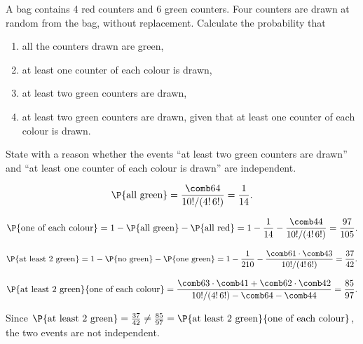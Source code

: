 \begin{problem}
    A bag contains 4 red counters and 6 green counters. Four counters are drawn at random from the bag, without replacement. Calculate the probability that
    \begin{enumerate}
        \item all the counters drawn are green,
        \item at least one counter of each colour is drawn,
        \item at least two green counters are drawn,
        \item at least two green counters are drawn, given that at least one counter of each colour is drawn.
    \end{enumerate}
    State with a reason whether the events ``at least two green counters are drawn'' and ``at least one counter of each colour is drawn'' are independent.
\end{problem}
\begin{solution}
    \begin{ppart}
        \[\P{\text{all green}} = \frac{\comb64}{10!/(4! \, 6!)} = \frac1{14}.\]
    \end{ppart}
    \begin{ppart}
        \[ \P{\text{one of each colour}} = 1 - \P{\text{all green}} - \P{\text{all red}} = 1 - \frac1{14} - \frac{\comb44}{10!/(4! \, 6!)} = \frac{97}{105}.\]
    \end{ppart}
    \begin{ppart}
        \[\P{\text{at least 2 green}} = 1 - \P{\text{no green}} - \P{\text{one green}} = 1 - \frac1{210} - \frac{\comb61 \cdot \comb43}{10!/(4! \, 6!)} = \frac{37}{42}.\]
    \end{ppart}
    \begin{ppart}
        \[\P{\text{at least 2 green}}{\text{one of each colour}} = \frac{\comb63 \cdot \comb41 + \comb62 \cdot \comb42}{10!/(4! \, 6!) - \comb64 - \comb44}= \frac{85}{97}.\]
    \end{ppart}

    Since $\P{\text{at least 2 green}} = \frac{37}{42} \neq \frac{85}{97} = \P{\text{at least 2 green}}{\text{one of each colour}}$, the two events are not independent.
\end{solution}

